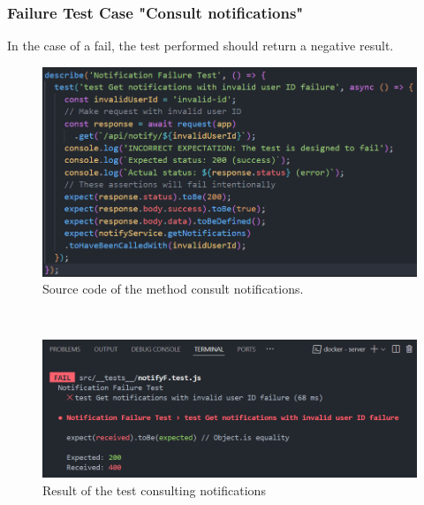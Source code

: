 \subsubsection{Failure Test Case "Consult notifications"}
In the case of a fail, the test performed should return a negative result.
\begin{figure}[h!]
    \centering
    \includegraphics[width=1\textwidth]{figures/consult notifF code.png}
    \caption{Source code of the method consult notifications.}
\end{figure} \
\clearpage
\begin{figure}[h!]
    \centering
    \includegraphics[width=1\textwidth]{figures/result consult notifF.png}  
    \caption{Result of the test consulting notifications}
\end{figure} \


